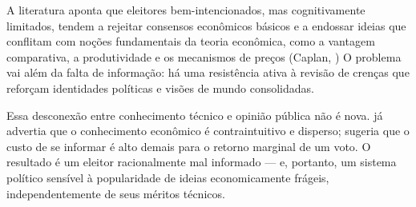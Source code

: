 A literatura aponta que eleitores bem-intencionados, mas cognitivamente limitados, tendem a rejeitar consensos econômicos básicos e a endossar ideias que conflitam com noções fundamentais da teoria econômica, como a vantagem comparativa, a produtividade e os mecanismos de preços (Caplan, \citeyear{Systematically_Biased_Beliefs_about_Economics,The_Myth_of_the_Rational_Voter}) O problema vai além da falta de informação: há uma resistência ativa à revisão de crenças que reforçam identidades políticas e visões de mundo consolidadas.

Essa desconexão entre conhecimento técnico e opinião pública não é nova.  já advertia que o conhecimento econômico é contraintuitivo e disperso;  sugeria que o custo de se informar é alto demais para o retorno marginal de um voto. O resultado é um eleitor racionalmente mal informado — e, portanto, um sistema político sensível à popularidade de ideias economicamente frágeis, independentemente de seus méritos técnicos.




